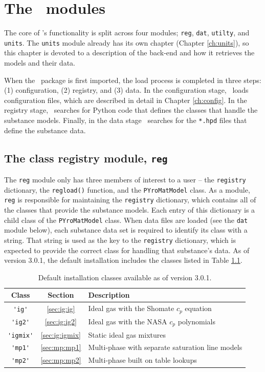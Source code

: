 \chapter{The \PM\ modules}\label{ch:regdat}

The core of \PM's functionality is split across four modules; \texttt{reg}, \texttt{dat}, \texttt{utilty}, and \texttt{units}.  The \texttt{units} module already has its own chapter (Chapter \ref{ch:units}), so this chapter is devoted to a description of the back-end and how it retrieves the models and their data.

When the \PM\ package is first imported, the load process is completed in three steps: (1) configuration, (2) registry, and (3) data.  In the configuration stage, \PM\ loads configuration files, which are described in detail in Chapter \ref{ch:config}.  In the registry stage, \PM\ searches for Python code that defines the classes that handle the substance models.  Finally, in the data stage \PM\ searches for the \texttt{*.hpd} files that define the substance data. 

\section{The class registry module, \texttt{reg}}

The \texttt{reg} module only has three members of interest to a user -- the \texttt{registry} dictionary, the \texttt{regload()} function, and the \texttt{PYroMatModel} class.  As a module, \texttt{reg} is responsible for maintaining the \texttt{registry} dictionary, which contains all of the classes that provide the substance models.  Each entry of this dictionary is a child class of the \texttt{PYroMatModel} class.  When data files are loaded (see the \texttt{dat} module below), each substance data set is required to identify its class with a string.  That string is used as the key to the \texttt{registry} dictionary, which is expected to provide the correct class for handling that substance's data.  As of version 3.0.1, the default installation includes the classes listed in Table \ref{tab:regdat:classes}.

\begin{table}
\centering
\caption{Default installation classes available as of version 3.0.1.}\label{tab:regdat:classes}
\begin{tabular}{|ccp{2in}|}
\hline
Class & Section & Description \\
\hline
\verb|'ig'| & \ref{sec:ig:ig} & Ideal gas with the Shomate $c_p$ equation\\
\verb|'ig2'| & \ref{sec:ig:ig2} & Ideal gas with the NASA $c_p$ polynomials \\
\verb|'igmix'| & \ref{sec:ig:igmix} & Static ideal gas mixtures\\
\verb|'mp1'| & \ref{sec:mp:mp1} & Multi-phase with separate saturation line models\\
\verb|'mp2'| & \ref{sec:mp:mp2} & Multi-phase built on table lookups\\
\hline
\end{tabular}
\end{table}

